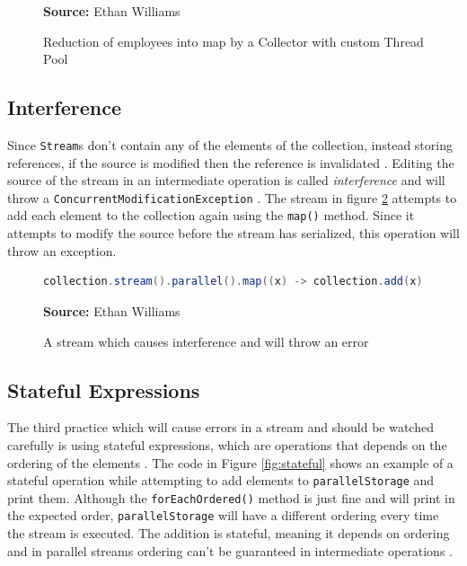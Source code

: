 \documentclass[oneside, 12pt]{article}
\newcommand{\source}[1]{\textbf{Source:} {#1} }
\begin{document}
\begin{figure}[H]
\centering
\begin{lstlisting}[language=Java]

\end{lstlisting}
\caption{Reduction of employees into map by a Collector with custom Thread Pool}
\source{Ethan Williams}
\label{fig:custom_pool}
\end{figure}

\subsection{Interference}
Since \verb|Stream|s don't contain any of the elements of the collection, instead storing references, if the source is modified then the reference is invalidated \autocite{ibm_streams}. Editing the source of the stream in an intermediate operation is called \textit{interference} and will throw a \verb|ConcurrentModificationException| \autocite{parallelism_doc}. The stream in figure \ref{fig:interference} attempts to add each element to the collection again using the \verb|map()| method. Since it attempts to modify the source before the stream has serialized, this operation will throw an exception.

\begin{figure}[H]
\centering
\begin{lstlisting}[language=Java]
collection.stream().parallel().map((x) -> collection.add(x)).toArray();
\end{lstlisting}
\caption{A stream which causes interference and will throw an error}
\source{Ethan Williams}
\label{fig:interference}
\end{figure}

\subsection{Stateful Expressions} \label{stateful_expressions}
The third practice which will cause errors in a stream and should be watched carefully is using stateful expressions, which are operations that depends on the ordering of the elements \autocite{expression_state}. The code in Figure \ref{fig:stateful} shows an example of a stateful operation while attempting to add elements to \verb|parallelStorage| and print them. Although the \verb|forEachOrdered()| method is just fine and will print in the expected order, \verb|parallelStorage| will have a different ordering every time the stream is executed. The addition is stateful, meaning it depends on ordering and in parallel streams ordering can't be guaranteed in intermediate operations \autocite{parallelism_doc}.
\end{document}
